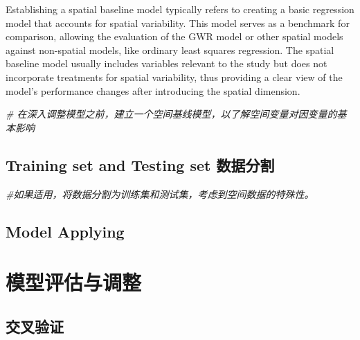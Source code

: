\documentclass[
]{article}
\newenvironment{Shaded}{\begin{snugshade}}{\end{snugshade}}
\newcommand{\CommentTok}[1]{\textcolor[rgb]{0.56,0.35,0.01}{\textit{#1}}}
\begin{document}
Establishing a spatial baseline model typically refers to creating a
basic regression model that accounts for spatial variability. This model
serves as a benchmark for comparison, allowing the evaluation of the GWR
model or other spatial models against non-spatial models, like ordinary
least squares regression. The spatial baseline model usually includes
variables relevant to the study but does not incorporate treatments for
spatial variability, thus providing a clear view of the model's
performance changes after introducing the spatial dimension.

\begin{Shaded}
\begin{Highlighting}[]
\CommentTok{\# 在深入调整模型之前，建立一个空间基线模型，以了解空间变量对因变量的基本影响}
\end{Highlighting}
\end{Shaded}

\hypertarget{training-set-and-testing-set-ux6570ux636eux5206ux5272}{%
\subsection{Training set and Testing set
数据分割}\label{training-set-and-testing-set-ux6570ux636eux5206ux5272}}

\begin{Shaded}
\begin{Highlighting}[]
\CommentTok{\#如果适用，将数据分割为训练集和测试集，考虑到空间数据的特殊性。}
\end{Highlighting}
\end{Shaded}

\hypertarget{model-applying}{%
\subsection{Model Applying}\label{model-applying}}

\hypertarget{ux6a21ux578bux8bc4ux4f30ux4e0eux8c03ux6574}{%
\section{模型评估与调整}\label{ux6a21ux578bux8bc4ux4f30ux4e0eux8c03ux6574}}

\hypertarget{ux4ea4ux53c9ux9a8cux8bc1}{%
\subsection{交叉验证}\label{ux4ea4ux53c9ux9a8cux8bc1}}
\end{document}
